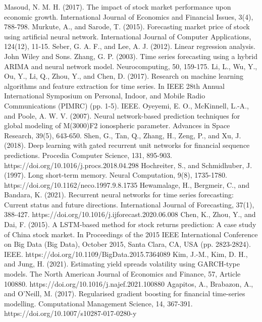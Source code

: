 \documentclass{ieeeojies}
\begin{document}
\begin{thebibliography}{00}
 Masoud, N. M. H. (2017). The impact of stock market performance upon economic growth. International Journal of Economics and Financial Issues, 3(4), 788-798.
 Murkute, A., and Sarode, T. (2015). Forecasting market price of stock using artificial neural network. International Journal of Computer Applications, 124(12), 11-15.
 Seber, G. A. F., and Lee, A. J. (2012). Linear regression analysis. John Wiley and Sons.
 Zhang, G. P. (2003). Time series forecasting using a hybrid ARIMA and neural network model. Neurocomputing, 50, 159-175.
 Li, L., Wu, Y., Ou, Y., Li, Q., Zhou, Y., and Chen, D. (2017). Research on machine learning algorithms and feature extraction for time series. In IEEE 28th Annual International Symposium on Personal, Indoor, and Mobile Radio Communications (PIMRC) (pp. 1-5). IEEE.
 Oyeyemi, E. O., McKinnell, L.-A., and Poole, A. W. V. (2007). Neural network-based prediction techniques for global modeling of M(3000)F2 ionospheric parameter. Advances in Space Research, 39(5), 643-650.
Shen, G., Tan, Q., Zhang, H., Zeng, P., and Xu, J. (2018). Deep learning with gated recurrent unit networks for financial sequence predictions. Procedia Computer Science, 131, 895-903. https://doi.org/10.1016/j.procs.2018.04.298
  Hochreiter, S., and Schmidhuber, J. (1997). Long short-term memory. Neural Computation, 9(8), 1735-1780. https://doi.org/10.1162/neco.1997.9.8.1735
 Hewamalage, H., Bergmeir, C., and Bandara, K. (2021). Recurrent neural networks for time series forecasting: Current status and future directions. International Journal of Forecasting, 37(1), 388-427. https://doi.org/10.1016/j.ijforecast.2020.06.008
 Chen, K., Zhou, Y., and Dai, F. (2015). A LSTM-based method for stock returns prediction: A case study of China stock market. In Proceedings of the 2015 IEEE International Conference on Big Data (Big Data), October 2015, Santa Clara, CA, USA (pp. 2823-2824). IEEE. https://doi.org/10.1109/BigData.2015.7364089
 Kim, J.-M., Kim, D. H., and Jung, H. (2021). Estimating yield spreads volatility using GARCH-type models. The North American Journal of Economics and Finance, 57, Article 100880. https://doi.org/10.1016/j.najef.2021.100880
 Agapitos, A., Brabazon, A., and O’Neill, M. (2017). Regularised gradient boosting for financial time-series modelling. Computational Management Science, 14, 367-391. https://doi.org/10.1007/s10287-017-0280-y

\end{thebibliography}
\end{document}
